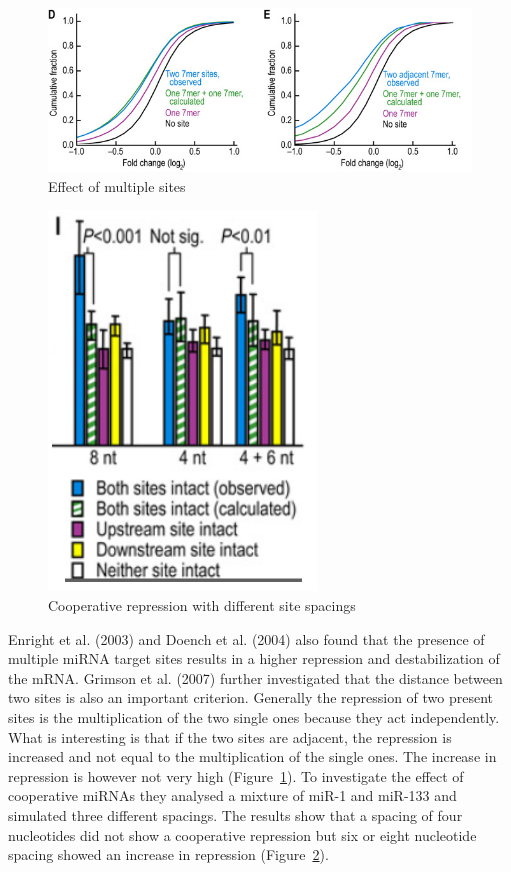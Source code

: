 \documentclass[11pt, a4paper, oneside]{book}
\begin{document}
\begin{figure}
\centering
\includegraphics[scale=0.65]{results/sites_distance.PNG}
\caption{Effect of multiple sites}
\label{sitedistance}
\end{figure}

\begin{figure}
\centering
\includegraphics[scale=0.6]{results/sites_8nt.PNG}  
\caption{Cooperative repression with different site spacings}
\label{sitespacing}
\end{figure}

Enright et al. (2003) and Doench et al. (2004) also found that the presence of multiple miRNA target sites results in a higher repression and destabilization of the mRNA. Grimson et al. (2007) further investigated that the distance between two sites is also an important criterion. Generally the repression of two present sites is the multiplication of the two single ones because they act independently. What is interesting is that if the two sites are adjacent, the repression is increased and not equal to the multiplication of the single ones. The increase in repression is however not very high (Figure~\ref{sitedistance}). To investigate the effect of cooperative miRNAs they analysed a mixture of miR-1 and miR-133 and simulated three different spacings. The results show that a spacing of four nucleotides did not show a cooperative repression but six or eight nucleotide spacing showed an increase in repression (Figure~\ref{sitespacing}). \\
\end{document}
